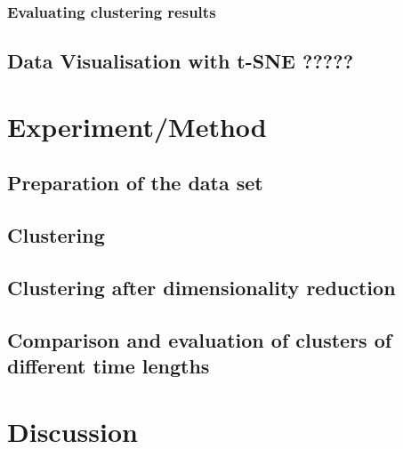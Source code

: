     \subsubsection{Evaluating clustering results}
    \label{section:TheoryEvaluatingClusteringResults}
    

  \subsection{Data Visualisation with t-SNE ?????}



\section{Experiment/Method}
\label{section:Experiment}


  \subsection{Preparation of the data set}
  \label{section:ExperimentPreparationDataSet}
  

  \subsection{Clustering}
  \label{section:ExperimentClustering}
  

  \subsection{Clustering after dimensionality reduction}
  \label{section:ExperimentClusteringAfterDimensionalityReduction}
  

  \subsection{Comparison and evaluation of clusters of different time lengths}
  \label{section:ExperimentComparisonTimeLengths}
  



\section{Discussion}
\label{section:Discussion}




